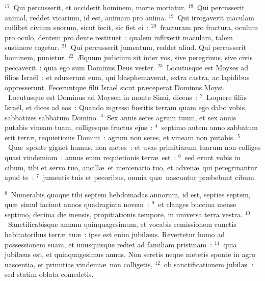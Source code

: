 ${}^{17}$~Qui percusserit, et occiderit hominem, morte moriatur.
${}^{18}$~Qui percusserit animal, reddet vicarium, id est, animam pro anima.
${}^{19}$~Qui irrogaverit maculam cuilibet civium suorum, sicut fecit, sic fiet ei~:
${}^{20}$~fracturam pro fractura, oculum pro oculo, dentem pro dente restituet~: qualem inflixerit maculam, talem sustinere cogetur.
${}^{21}$~Qui percusserit jumentum, reddet aliud. Qui percusserit hominem, punietur.
${}^{22}$~\AE quum judicium sit inter vos, sive peregrinus, sive civis peccaverit~: quia ego sum Dominus Deus vester.
${}^{23}$~Locutusque est Moyses ad filios Isra\"el~: et eduxerunt eum, qui blasphemaverat, extra castra, ac lapidibus oppresserunt. Feceruntque filii Isra\"el sicut pr\ae ceperat Dominus Moysi.
~Locutusque est Dominus ad Moysen in monte Sinai, dicens~:
${}^{2}$~Loquere filiis Isra\"el, et dices ad eos~: Quando ingressi fueritis terram quam ego dabo vobis, sabbatizes sabbatum Domino.
${}^{3}$~Sex annis seres agrum tuum, et sex annis putabis vineam tuam, colligesque fructus ejus~:
${}^{4}$~septimo autem anno sabbatum erit terr\ae , requietionis Domini~: agrum non seres, et vineam non putabis.
${}^{5}$~Qu\ae\ sponte gignet humus, non metes~: et uvas primitiarum tuarum non colliges quasi vindemiam~: annus enim requietionis terr\ae\ est~:
${}^{6}$~sed erunt vobis in cibum, tibi et servo tuo, ancill\ae\ et mercenario tuo, et adven\ae\ qui peregrinantur apud te~:
${}^{7}$~jumentis tuis et pecoribus, omnia qu\ae\ nascuntur pr\ae bebunt cibum.


${}^{8}$~Numerabis quoque tibi septem hebdomadas annorum, id est, septies septem, qu\ae\ simul faciunt annos quadraginta novem~:
${}^{9}$~et clanges buccina mense septimo, decima die mensis, propitiationis tempore, in universa terra vestra.
${}^{10}$~Sanctificabisque annum quinquagesimum, et vocabis remissionem cunctis habitatoribus terr\ae\ tu\ae~: ipse est enim jubil\ae us. Revertetur homo ad possessionem suam, et unusquisque rediet ad familiam pristinam~:
${}^{11}$~quia jubil\ae us est, et quinquagesimus annus. Non seretis neque metetis sponte in agro nascentia, et primitias vindemi\ae\ non colligetis,
${}^{12}$~ob sanctificationem jubil\ae i~: sed statim oblata comedetis.



